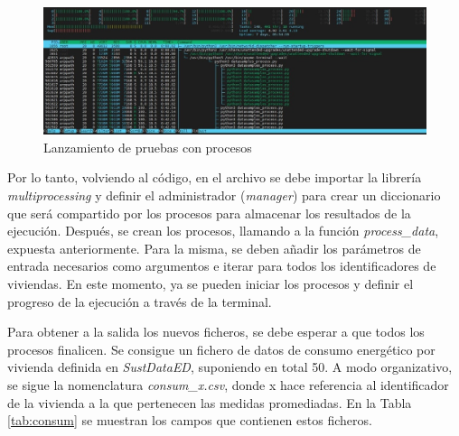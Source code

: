 \vspace{3mm}

\begin{figure}[H]
  \centering
  \includegraphics[width=1\textwidth]{img/diseno/multiprocess.jpg}
  \caption{Lanzamiento de pruebas con procesos}
  \label{fig:multiprocess}
\end{figure}

\vspace{3mm}

Por lo tanto, volviendo al código, en el archivo se debe importar la librería \textit{multiprocessing} y definir el administrador (\textit{manager}) para crear un diccionario que será compartido por los procesos para almacenar los resultados de la ejecución. Después, se crean los procesos, llamando a la función \textit{process\_data}, expuesta anteriormente. Para la misma, se deben añadir los parámetros de entrada necesarios como argumentos e iterar para todos los identificadores de viviendas. En este momento, ya se pueden iniciar los procesos y definir el progreso de la ejecución a través de la terminal. 

\vspace{3mm}

Para obtener a la salida los nuevos ficheros, se debe esperar a que todos los procesos finalicen. Se consigue un fichero de datos de consumo energético por vivienda definida en \textit{SustDataED}, suponiendo en total 50. A modo organizativo, se sigue la nomenclatura \textit{consum\_x.csv}, donde x hace referencia al identificador de la vivienda a la que pertenecen las medidas promediadas. En la Tabla \ref{tab:consum} se muestran los campos que contienen estos ficheros. 

